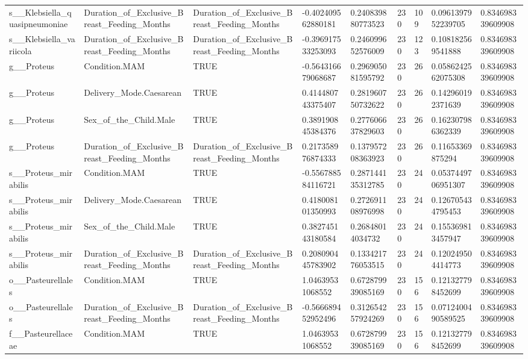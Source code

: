 \begin{longtable}{lllllllll}
s\_\_Klebsiella\_quasipneumoniae & Duration\_of\_Exclusive\_Breast\_Feeding\_Months & Duration\_of\_Exclusive\_Breast\_Feeding\_Months & -0.402409562880181 & 0.240839880773523 & 230 & 109 & 0.0961397952239705 & 0.834698339609908 \\
s\_\_Klebsiella\_variicola & Duration\_of\_Exclusive\_Breast\_Feeding\_Months & Duration\_of\_Exclusive\_Breast\_Feeding\_Months & -0.396917533253093 & 0.246099652576009 & 230 & 123 & 0.108182569541888 & 0.834698339609908 \\
g\_\_Proteus & Condition.MAM & TRUE & -0.564316679068687 & 0.296905081595792 & 230 & 26 & 0.0586242562075308 & 0.834698339609908 \\
g\_\_Proteus & Delivery\_Mode.Caesarean & TRUE & 0.414480743375407 & 0.281960750732622 & 230 & 26 & 0.142960192371639 & 0.834698339609908 \\
g\_\_Proteus & Sex\_of\_the\_Child.Male & TRUE & 0.389190845384376 & 0.277606637829603 & 230 & 26 & 0.162307986362339 & 0.834698339609908 \\
g\_\_Proteus & Duration\_of\_Exclusive\_Breast\_Feeding\_Months & Duration\_of\_Exclusive\_Breast\_Feeding\_Months & 0.217358976874333 & 0.137957208363923 & 230 & 26 & 0.11653369875294 & 0.834698339609908 \\
s\_\_Proteus\_mirabilis & Condition.MAM & TRUE & -0.556788584116721 & 0.287144135312785 & 230 & 24 & 0.0537449706951307 & 0.834698339609908 \\
s\_\_Proteus\_mirabilis & Delivery\_Mode.Caesarean & TRUE & 0.418008101350993 & 0.272691108976998 & 230 & 24 & 0.126705434795453 & 0.834698339609908 \\
s\_\_Proteus\_mirabilis & Sex\_of\_the\_Child.Male & TRUE & 0.382745143180584 & 0.26848014034732 & 230 & 24 & 0.155369813457947 & 0.834698339609908 \\
s\_\_Proteus\_mirabilis & Duration\_of\_Exclusive\_Breast\_Feeding\_Months & Duration\_of\_Exclusive\_Breast\_Feeding\_Months & 0.208090445783902 & 0.133421776053515 & 230 & 24 & 0.120249504414773 & 0.834698339609908 \\
o\_\_Pasteurellales & Condition.MAM & TRUE & 1.04639531068552 & 0.672879939085169 & 230 & 156 & 0.121327798452699 & 0.834698339609908 \\
o\_\_Pasteurellales & Duration\_of\_Exclusive\_Breast\_Feeding\_Months & Duration\_of\_Exclusive\_Breast\_Feeding\_Months & -0.566689452952496 & 0.312654257924269 & 230 & 156 & 0.0712400490589525 & 0.834698339609908 \\
f\_\_Pasteurellaceae & Condition.MAM & TRUE & 1.04639531068552 & 0.672879939085169 & 230 & 156 & 0.121327798452699 & 0.834698339609908 \\

\end{longtable}
